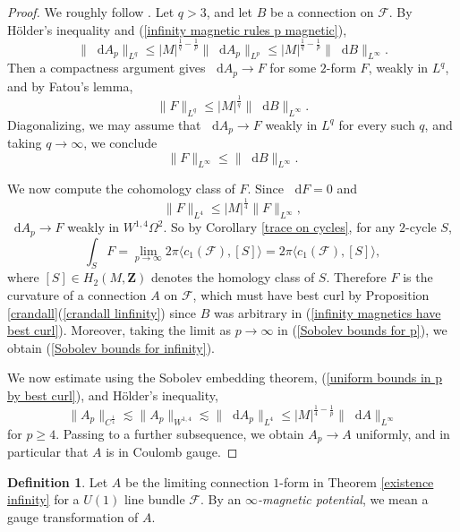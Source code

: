 \documentclass[reqno,11pt]{amsart}
\newcommand{\ZZ}{\mathbf{Z}}
\newcommand*\dif{\mathop{}\!\mathrm{d}}
\newcommand{\dfn}[1]{\emph{#1}\index{#1}}
\theoremstyle{definition}
\newtheorem{definition}[theorem]{Definition}
\numberwithin{equation}{section}
\begin{document}
\begin{proof}
We roughly follow \cite[\S3]{Lindqvist14}.
Let $q > 3$, and let $B$ be a connection on $\mathscr F$.
By H\"older's inequality and (\ref{infinity magnetic rules p magnetic}),
\begin{equation}\label{uniform bounds in p by best curl}
	\|\dif A_p\|_{L^q} \leq |M|^{\frac{1}{q} - \frac{1}{p}} \|\dif A_p\|_{L^p} \leq |M|^{\frac{1}{q} - \frac{1}{p}} \|\dif B\|_{L^\infty}.
\end{equation}
Then a compactness argument gives $\dif A_p \to F$ for some $2$-form $F$, weakly in $L^q$, and by Fatou's lemma, 
$$\|F\|_{L^q} \leq |M|^{\frac{1}{q}} \|\dif B\|_{L^\infty}.$$
Diagonalizing, we may assume that $\dif A_p \to F$ weakly in $L^q$ for every such $q$, and taking $q \to \infty$, we conclude 
\begin{equation}\label{infinity magnetics have best curl}
	\|F\|_{L^\infty} \leq \|\dif B\|_{L^\infty}.
\end{equation}

We now compute the cohomology class of $F$.
Since $\dif F = 0$ and
$$\|F\|_{L^4} \leq |M|^{\frac{1}{4}} \|F\|_{L^\infty},$$
$\dif A_p \to F$ weakly in $W^{1, 4} \Omega^2$.
So by Corollary \ref{trace on cycles}, for any $2$-cycle $S$,
$$\int_S F = \lim_{p \to \infty} 2\pi \langle c_1(\mathscr F), [S] \rangle = 2\pi \langle c_1(\mathscr F), [S]\rangle,$$
where $[S] \in H_2(M, \ZZ)$ denotes the homology class of $S$.
Therefore $F$ is the curvature of a connection $A$ on $\mathscr F$, which must have best curl by Proposition \ref{crandall}(\ref{crandall linfinity}) since $B$ was arbitrary in (\ref{infinity magnetics have best curl}).
Moreover, taking the limit as $p \to \infty$ in (\ref{Sobolev bounds for p}), we obtain (\ref{Sobolev bounds for infinity}).

We now estimate using the Sobolev embedding theorem, (\ref{uniform bounds in p by best curl}), and H\"older's inequality,
$$\|A_p\|_{C^{\frac{1}{4}}} \lesssim \|A_p\|_{W^{1, 4}} \lesssim \|\dif A_p\|_{L^4} \leq |M|^{\frac{1}{4} - \frac{1}{p}} \|\dif A\|_{L^\infty}$$
for $p \geq 4$.
Passing to a further subsequence, we obtain $A_p \to A$ uniformly, and in particular that $A$ is in Coulomb gauge.
\end{proof}

\begin{definition}
Let $A$ be the limiting connection $1$-form in Theorem \ref{existence infinity} for a $U(1)$ line bundle $\mathscr F$.
By an \dfn{$\infty$-magnetic potential}, we mean a gauge transformation of $A$.
\end{definition}
\end{document}
